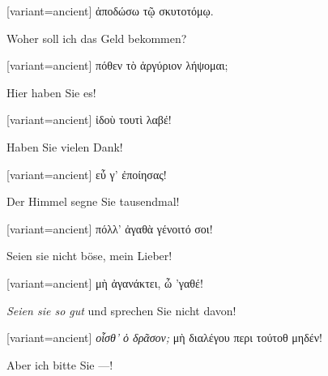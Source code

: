 \switchcolumn

\begin{greek}[variant=ancient]%
ἀποδώσω τῷ σκυτοτόμῳ.

\end{greek}%
\switchcolumn*

Woher soll ich das Geld bekommen? 

\switchcolumn

\begin{greek}[variant=ancient]%
πόθεν τὸ ἀργύριον λήψομαι;

\end{greek}%
\switchcolumn*

Hier haben Sie es! 

\switchcolumn

\begin{greek}[variant=ancient]%
ἰδοὺ τουτὶ λαβέ!

\end{greek}%
\switchcolumn*

Haben Sie vielen Dank! 

\switchcolumn

\begin{greek}[variant=ancient]%
εὖ γ' ἐποίησας!

\end{greek}%
\switchcolumn*

Der Himmel segne Sie tausendmal! 

\switchcolumn

\begin{greek}[variant=ancient]%
πόλλ' ἀγαθὰ γένοιτό σοι!

\end{greek}%
\switchcolumn*

Seien sie nicht böse, mein Lieber! 

\switchcolumn

\begin{greek}[variant=ancient]%
μὴ ἀγανάκτει, ὦ 'γαθέ!

\end{greek}%
\switchcolumn*

\emph{Seien sie so gut} und sprechen Sie nicht davon! 

\switchcolumn

\begin{greek}[variant=ancient]%
\emph{οἶσθ' ὁ δρᾶσον;} μὴ διαλέγου περι τούτοθ μηδέν!

\end{greek}%
\switchcolumn*

Aber ich bitte Sie —! 

